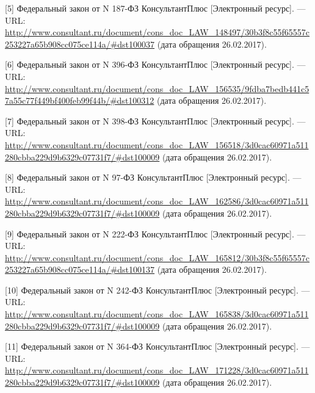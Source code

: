 \documentclass[14pt,a4paper,report]{article}
\begin{document}
[5] Федеральный закон от N 187-ФЗ КонсультантПлюс [Электронный ресурс]. — URL: \href{http://www.consultant.ru/document/cons_doc_LAW_148497/30b3f8c55f65557c253227a65b908cc075ce114a/#dst100037}{http://www.consultant.\linebreak ru/document/cons\_doc\_LAW\_148497/30b3f8c55f65557c253227a65b908cc075ce114a/\#dst100037} (дата обращения 26.02.2017).

[6] Федеральный закон от N 396-ФЗ КонсультантПлюс [Электронный ресурс]. — URL: \href{http://www.consultant.ru/document/cons_doc_LAW_156535/9fdba7bedb441c57a55c77f449bf400feb99f44b/#dst100312}{http://www.consultant.\linebreak ru/document/cons\_doc\_LAW\_156535/9fdba7bedb441c57a55c77f449bf400feb99f44b/\#dst100312} (дата обращения 26.02.2017).

[7] Федеральный закон от N 398-ФЗ КонсультантПлюс [Электронный ресурс]. — URL: \href{http://www.consultant.ru/document/cons_doc_LAW_156518/3d0cac60971a511280cbba229d9b6329c07731f7/#dst100009}{http://www.consultant.\linebreak ru/document/cons\_doc\_LAW\_156518/3d0cac60971a511280cbba229d9b6329c07731f7/\#dst100009} (дата обращения 26.02.2017).

[8] Федеральный закон от N 97-ФЗ КонсультантПлюс [Электронный ресурс]. — URL: \href{http://www.consultant.ru/document/cons_doc_LAW_162586/3d0cac60971a511280cbba229d9b6329c07731f7/#dst100009}{http://www.consultant.\linebreak ru/document/cons\_doc\_LAW\_162586/3d0cac60971a511280cbba229d9b6329c07731f7/\#dst100009} (дата обращения 26.02.2017).

[9] Федеральный закон от N 222-ФЗ КонсультантПлюс [Электронный ресурс]. — URL: \href{http://www.consultant.ru/document/cons_doc_LAW_165812/30b3f8c55f65557c253227a65b908cc075ce114a/#dst100137}{http://www.consultant.\linebreak ru/document/cons\_doc\_LAW\_165812/30b3f8c55f65557c253227a65b908cc075ce114a/\#dst100137} (дата обращения 26.02.2017).

[10] Федеральный закон от N 242-ФЗ КонсультантПлюс [Электронный ресурс]. — URL: \href{http://www.consultant.ru/document/cons_doc_LAW_165838/3d0cac60971a511280cbba229d9b6329c07731f7/#dst100009}{http://www.consultant.\linebreak ru/document/cons\_doc\_LAW\_165838/3d0cac60971a511280cbba229d9b6329c07731f7/\#dst100009} (дата обращения  26.02.2017).

[11] Федеральный закон от N 364-ФЗ КонсультантПлюс [Электронный ресурс]. — URL: \href{http://www.consultant.ru/document/cons_doc_LAW_171228/3d0cac60971a511280cbba229d9b6329c07731f7/#dst100009}{http://www.consultant.\linebreak ru/document/cons\_doc\_LAW\_171228/3d0cac60971a511280cbba229d9b6329c07731f7/\#dst100009} (дата обращения 26.02.2017).
\end{document}

